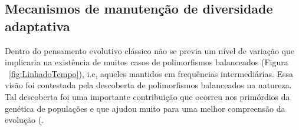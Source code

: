 \begin{refsection}
\subsection{Mecanismos de manutenção de diversidade adaptativa}%


%

	Dentro do pensamento evolutivo clássico não se previa um nível de variação que implicaria na existência de muitos casos de polimorfismos balanceados (Figura ~\ref{fig:LinhadoTempo}), i.e, aqueles mantidos em frequências intermediárias. Essa visão foi contestada pela descoberta de polimorfismos balanceados na natureza. Tal descoberta foi uma importante contribuição que ocorreu nos primórdios da genética de populações e que ajudou muito para uma melhor compreensão da evolução (\cite{Charlesworth2010}. 
%


\end{refsection}
